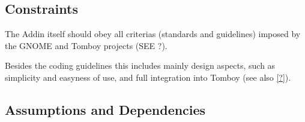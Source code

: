 \subsection{Constraints}
\label{description:constraints}
The Addin itself should obey all criterias (standards and guidelines) imposed by the GNOME and Tomboy projects (SEE ?). %

Besides the coding guidelines this includes mainly design aspects, such as simplicity and easyness of use, and full integration into Tomboy (see also \ref{?}).


\subsection{Assumptions and Dependencies}
\label{description:assumptions}

